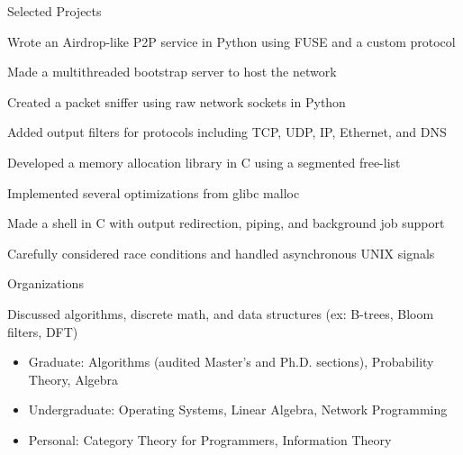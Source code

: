 \documentclass{cv}
\begin{document}
\begin{cvsection}{Selected Projects}
  {
    \item Wrote an Airdrop-like P2P service in Python using FUSE and a custom protocol
    \item Made a multithreaded bootstrap server to host the network
  }
  {
    \item Created a packet sniffer using raw network sockets in Python
    \item Added output filters for protocols including TCP, UDP, IP, Ethernet, and DNS
  }
  {
    \item Developed a memory allocation library in C using a segmented free-list
    \item Implemented several optimizations from glibc malloc
  }
  {
    \item Made a shell in C with output redirection, piping, and background job support
    \item Carefully considered race conditions and handled asynchronous UNIX signals
  }
\end{cvsection}

\begin{cvsection}{Organizations}
  {
    \item Discussed algorithms, discrete math, and data structures (ex: B-trees, Bloom filters, DFT)
  }
\end{cvsection}

\begin{minipage}{\textwidth}
  \begin{itemize}[noitemsep,topsep=0pt]%
    \item Graduate: Algorithms (audited Master's and Ph.D. sections), Probability Theory, Algebra
    \item Undergraduate: Operating Systems, Linear Algebra, Network Programming
    \item Personal: Category Theory for Programmers, Information Theory
  \end{itemize}%
\end{minipage}%
\end{document}
